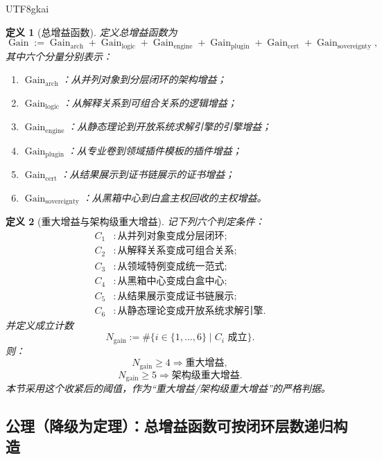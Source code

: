 \documentclass[12pt]{article}
\newtheorem{definition}{定义}[section]
\begin{document}
\begin{CJK*}{UTF8}{gkai}
\begin{definition}[总增益函数]
\label{def:tex39-ch4-gain}
定义总增益函数为
\[
  \operatorname{Gain}
  :=
  \operatorname{Gain}_{\mathrm{arch}}
  +
  \operatorname{Gain}_{\mathrm{logic}}
  +
  \operatorname{Gain}_{\mathrm{engine}}
  +
  \operatorname{Gain}_{\mathrm{plugin}}
  +
  \operatorname{Gain}_{\mathrm{cert}}
  +
  \operatorname{Gain}_{\mathrm{sovereignty}},
\]
其中六个分量分别表示：
\begin{enumerate}
  \item $\operatorname{Gain}_{\mathrm{arch}}$：从并列对象到分层闭环的架构增益；
  \item $\operatorname{Gain}_{\mathrm{logic}}$：从解释关系到可组合关系的逻辑增益；
  \item $\operatorname{Gain}_{\mathrm{engine}}$：从静态理论到开放系统求解引擎的引擎增益；
  \item $\operatorname{Gain}_{\mathrm{plugin}}$：从专业卷到领域插件模板的插件增益；
  \item $\operatorname{Gain}_{\mathrm{cert}}$：从结果展示到证书链展示的证书增益；
  \item $\operatorname{Gain}_{\mathrm{sovereignty}}$：从黑箱中心到白盒主权回收的主权增益。
\end{enumerate}
\end{definition}

\begin{definition}[重大增益与架构级重大增益]
\label{def:tex39-ch4-major}
记下列六个判定条件：
\[
\begin{aligned}
  C_1 &: \text{从并列对象变成分层闭环};\\
  C_2 &: \text{从解释关系变成可组合关系};\\
  C_3 &: \text{从领域特例变成统一范式};\\
  C_4 &: \text{从黑箱中心变成白盒中心};\\
  C_5 &: \text{从结果展示变成证书链展示};\\
  C_6 &: \text{从静态理论变成开放系统求解引擎}.
\end{aligned}
\]
并定义成立计数
\[
  N_{\mathrm{gain}}
  :=
  \#\bigl\{
    i\in\{1,\dots,6\}\mid C_i\text{ 成立}
  \bigr\}.
\]
则：
\[
  N_{\mathrm{gain}}\ge 4
  \Longrightarrow
  \text{重大增益},
\]
\[
  N_{\mathrm{gain}}\ge 5
  \Longrightarrow
  \text{架构级重大增益}.
\]
本节采用这个收紧后的阈值，作为“重大增益/架构级重大增益”的严格判据。
\end{definition}

\subsection{公理（降级为定理）：总增益函数可按闭环层数递归构造}
\label{subsec:tex39-ch4-axiom}


\end{CJK*}
\end{document}

